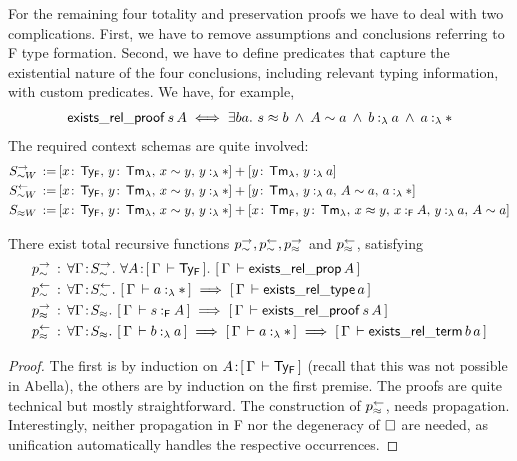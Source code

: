 For the remaining four totality and preservation proofs we have to deal with two complications.
First, we have to remove assumptions and conclusions referring to F type formation.
Second, we have to define predicates that capture the existential nature of the four conclusions, including relevant typing information, with custom predicates.
We have, for example,
\begin{align*}
  \mathsf{exists\_rel\_proof}\,s\,A \iff \mEx{ba} s \tmr b \mAnd A \tyr a \mAnd \typingLh{b}{a} \mAnd \typingLh{a}{\Prp}
\end{align*}
The required context schemas are quite involved:
\begin{align*}
  S_{\tyr W}^{\rightarrow} \eqdef &[x\sof\TyF \ssep y\sof\TmL \ssep x \tyr y \ssep \typingLh{y}{\Prp}] + [y\sof\TmL \ssep \typingLh{y}{a}]\\
  S_{\tyr W}^{\leftarrow} \eqdef &[x\sof\TyF \ssep y\sof\TmL \ssep x \tyr y \ssep \typingLh{y}{\Prp}] + [y\sof\TmL \ssep \typingLh{y}{a} \ssep A \tyr a \ssep \typingLh{a}{\Prp}]\\
  S_{\tmr W} \eqdef &[x\sof\TyF \ssep y\sof\TmL \ssep x \tyr y \ssep \typingLh{y}{\Prp}] + [x\sof\TmF \ssep y\sof\TmL \ssep x \tmr y \ssep \typingFh{x}{A} \ssep \typingLh{y}{a} \ssep A \tyr a]
\end{align*}
\begin{lemma}
  There exist total recursive functions $p^{\rightarrow}_{\mathrel{\sim}},p^{\leftarrow}_{\mathrel{\sim}},p^{\rightarrow}_{\mathrel{\approx}}$ and $p^{\leftarrow}_{\mathrel{\approx}}$, satisfying
  \begin{align*}
    p^{\rightarrow}_{\tyr} &\OF  \mAll{\Gamma \of S_{\tyr}^{\rightarrow}} \mAll{A \of \bc{\Gamma}{\TyF}} \bc{\Gamma}{\mathsf{exists\_rel\_prop}\,A}\\
    p^{\leftarrow}_{\tyr} &\OF \mAll{\Gamma \of S_{\tyr}^{\leftarrow}} \bc{\Gamma}{\typingLh{a}{\Prp}} \implies \bc{\Gamma}{\mathsf{exists\_rel\_type}\,a}\\
    p^{\rightarrow}_{\tmr} &\OF \mAll{\Gamma \of S_{\tmr}} \bc{\Gamma}{\typingFh{s}{A}} \implies \bc{\Gamma}{\mathsf{exists\_rel\_proof}\,s\,A}\\
    p^{\leftarrow}_{\tmr} &\OF \mAll{\Gamma \of S_{\tmr}} \bc{\Gamma}{\typingLh{b}{a}} \implies \bc{\Gamma}{\typingLh{a}{\Prp}} \implies \bc{\Gamma}{\mathsf{exists\_rel\_term}\,b\,a}
  \end{align*}
\end{lemma}
\begin{proof}
  The first is by induction on $A \!:\! [\,\Gamma\,\vdash \mathsf{Ty_{F}}\,]$ (recall that this was not possible in Abella), the others are by induction on the first premise.
  The proofs are quite technical but mostly straightforward.
  The construction of $p^{\leftarrow}_{\mathrel{\approx}}$, needs \SysL propagation.
  Interestingly, neither propagation in F nor the degeneracy of $\square$ are needed, as unification automatically handles the respective occurrences.
\end{proof}

